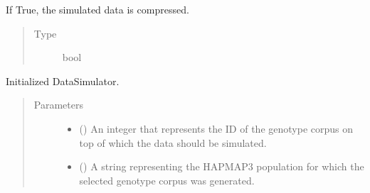 \documentclass[a4paper,10pt,english]{sphinxhowto}
\begin{document}
\begin{fulllineitems}
\begin{fulllineitems}
\begin{quote}
\begin{description}
\end{description}\end{quote}

\end{fulllineitems}


\begin{fulllineitems}
\label{\detokenize{utils:utils.data_simulator.DataSimulator.compress}}
If True, the simulated data is compressed.
\begin{quote}\begin{description}
\item[{Type}] \leavevmode
bool

\end{description}\end{quote}

\end{fulllineitems}


\begin{fulllineitems}
\label{\detokenize{utils:utils.data_simulator.DataSimulator.__init__}}
Initialized DataSimulator.
\begin{quote}\begin{description}
\item[{Parameters}] \leavevmode\begin{itemize}
\item {} 
 () \textendash{} An integer that represents the ID of the genotype corpus on top of which
the data should be simulated.

\item {} 
 () \textendash{} A string representing the HAPMAP3 population for which the selected genotype corpus was
generated.


\end{itemize}
\end{description}
\end{quote}
\end{fulllineitems}
\end{fulllineitems}
\end{document}
